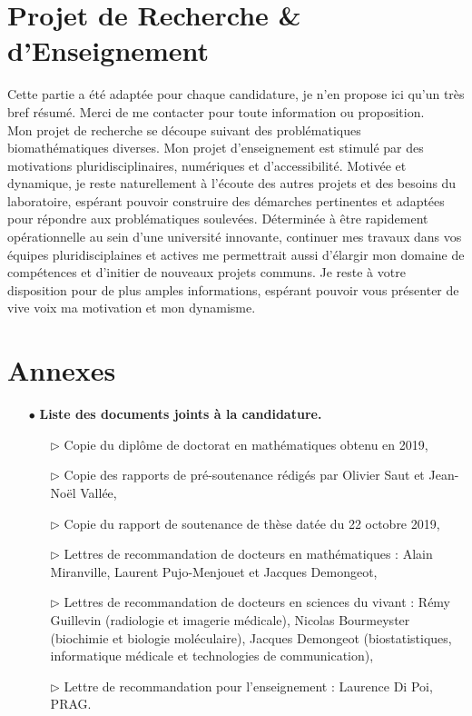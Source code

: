 \documentclass[a4paper, 12pt, twoside, openright]{article}
\begin{document}
\newpage
\section{Projet de Recherche \& d'Enseignement}

Cette partie a été adaptée pour chaque candidature, je n'en propose ici qu'un très bref résumé. Merci de me contacter pour toute information ou proposition.\\

Mon projet de recherche se découpe suivant des problématiques biomathématiques diverses. Mon projet d'enseignement est stimulé par des motivations pluridisciplinaires, numériques et d'accessibilité.
Motivée et dynamique, je reste naturellement à l'écoute des autres projets et des besoins du laboratoire, espérant pouvoir construire des démarches pertinentes et adaptées pour répondre aux problématiques soulevées. Déterminée à être rapidement opérationnelle au sein d'une université innovante, continuer mes travaux dans vos équipes pluridisciplaines et actives me permettrait aussi d'élargir mon domaine de compétences et d'initier de nouveaux projets communs. Je reste à votre disposition pour de plus amples informations, espérant pouvoir vous présenter de vive voix ma motivation et mon dynamisme.\\
 
\addtocounter{section}{1}



\vfill

\section{Annexes}
 \begin{itemize}
\item[\color{MagSombre}$\bullet$] \textbf{\color{MagSombre}Liste des documents joints à la candidature.}
 \begin{itemize}
 \item[$\triangleright$] Copie du diplôme de doctorat en mathématiques obtenu en 2019,
 \item[$\triangleright$] Copie des rapports de pré-soutenance rédigés par Olivier Saut et Jean-Noël Vallée,
\item[$\triangleright$] Copie du rapport de soutenance de thèse datée du 22 octobre 2019,
\item[$\triangleright$] Lettres de recommandation de docteurs en mathématiques : Alain Miranville, Laurent Pujo-Menjouet et Jacques Demongeot,
\item[$\triangleright$] Lettres de recommandation de docteurs en sciences du vivant : Rémy Guillevin (radiologie et imagerie médicale), Nicolas Bourmeyster (biochimie et biologie moléculaire), Jacques Demongeot (biostatistiques, informatique médicale et technologies de communication), 
\item[$\triangleright$] Lettre de recommandation pour l'enseignement : Laurence Di Poi, PRAG. 
 \end{itemize} 
 \end{itemize} 
 
 \vfill
 ~
 
\end{document}
